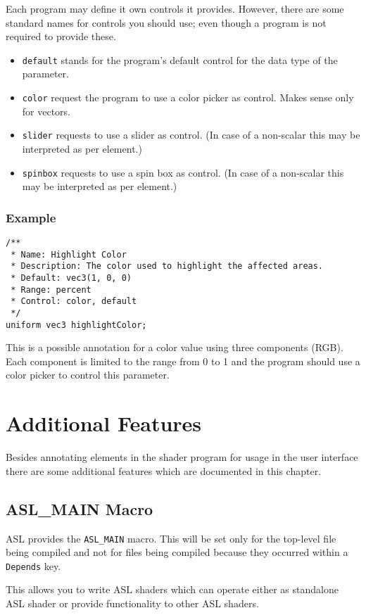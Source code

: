 \documentclass[11pt,a4paper]{scrreprt}
\begin{document}
Each program may define it own controls it provides. However, there are some 
standard names for controls you should use; even though a program is not 
required to provide these.
\begin{itemize}
    \item \verb$default$ stands for the program's default control for the data 
        type of the parameter.
    \item \verb$color$ request the program to use a color picker as control.  
        Makes sense only for vectors.
    \item \verb$slider$ requests to use a slider as control. (In case of 
        a non-scalar this may be interpreted as per element.)
    \item \verb$spinbox$ requests to use a spin box as control. (In case of 
        a non-scalar this may be interpreted as per element.)
\end{itemize}

\subsection{Example}
\begin{lstlisting}
/**
 * Name: Highlight Color
 * Description: The color used to highlight the affected areas.
 * Default: vec3(1, 0, 0)
 * Range: percent
 * Control: color, default
 */
uniform vec3 highlightColor;
\end{lstlisting}
This is a possible annotation for a color value using three components (RGB).  
Each component is limited to the range from 0 to 1 and the program should use 
a color picker to control this parameter.

\chapter{Additional Features}
Besides annotating elements in the shader program for usage in the user 
interface there are some additional features which are documented in this 
chapter.

\section{ASL\_MAIN Macro}
ASL provides the \lstinline$ASL_MAIN$ macro. This will be set only for the 
top-level file being compiled and not for files being compiled because they 
occurred within a \lstinline$Depends$ key.

This allows you to write ASL shaders which can operate either as standalone ASL 
shader or provide functionality to other ASL shaders.
\end{document}
